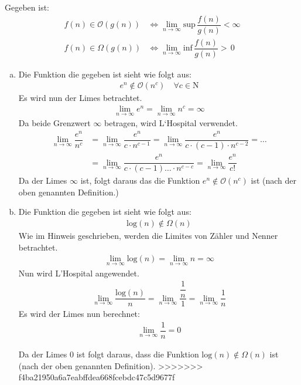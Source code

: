 \documentclass[11pt]{article}
\begin{document}
Gegeben ist:\\
\begin{align*}
f(n) \in  \mathcal{O}(g(n)) &\Leftrightarrow \lim\limits_{n \rightarrow \infty}{\text{sup}\, \dfrac{f(n)}{g(n)} < \infty}\\[0.5cm]
f(n) \in  \Omega(g(n)) &\Leftrightarrow \lim\limits_{n \rightarrow \infty}{\text{inf}\, \dfrac{f(n)}{g(n)} >\, 0}
\end{align*}
\begin{enumerate}[a)]
%
\item Die Funktion die gegeben ist sieht wie folgt aus:
\begin{align*}
e ^{n} \notin \mathcal{O}(n^{c})  \quad \forall c \in \mathrm{N}
\end{align*}
Es wird nun der Limes betrachtet.
\begin{align*}
\lim\limits_{n \rightarrow \infty}{e^{n}} = 
  \lim\limits_{n \rightarrow \infty}{n^c} = \infty
\end{align*}
Da beide Grenzwert $\infty$ betragen, wird L`Hospital verwendet.
\begin{align*}
\lim\limits_{n \rightarrow \infty}{\dfrac{e^{n}}{n^{c}}} &= \lim\limits_{n \rightarrow \infty}{\dfrac{e^{n}}{c \cdot n^{c - 1}}} = \lim\limits_{n \rightarrow \infty}{\dfrac{e^{n}}{c \cdot (c-1) \cdot n^{c - 2}}} = \ldots \\
& =\lim\limits_{n \rightarrow \infty}{\dfrac{e^{n}}{c \cdot (c-1) \ldots \cdot n^{c - c}}} = \lim\limits_{n \rightarrow \infty}{\dfrac{e^{n}}{c!}}
\end{align*}
Da der Limes $\infty$ ist, folgt daraus das die Funktion $e^{n} \notin \mathcal{O}(n^c)$ ist (nach der oben genannten Definition.)
\item  Die Funktion die gegeben ist sieht wie folgt aus:
\begin{align*}
\text{log}(n) \notin \Omega(n)
\end{align*}
Wie im Hinweis geschrieben, werden die Limites von Zähler und Nenner betrachtet.
\begin{align*}
\lim\limits_{n \rightarrow \infty}{\text{log}(n)} =
  \lim\limits_{n \rightarrow \infty}{n} = \infty
\end{align*}
Nun wird L'Hospital angewendet.
\begin{align*}
\lim\limits_{n \rightarrow \infty}{\dfrac{\text{log}(n)}{n}} = \lim\limits_{n \rightarrow \infty}{\dfrac{\dfrac{1}{n}}{1}} = \lim\limits_{n \rightarrow \infty}{\dfrac{1}{n}}
\end{align*}
Es wird der Limes nun berechnet:
\begin{align*}
\lim\limits_{n \rightarrow \infty}{\dfrac{1}{n}} = 0
\end{align*}

Da der Limes 0 ist folgt daraus, dass die Funktion $\text{log}(n) \notin \Omega(n)$ ist (nach der oben genannten Definition).
>>>>>>> f4ba21950a6a7eabffdea668fcebdc47c5d9677f

\end{enumerate}
\end{document}
